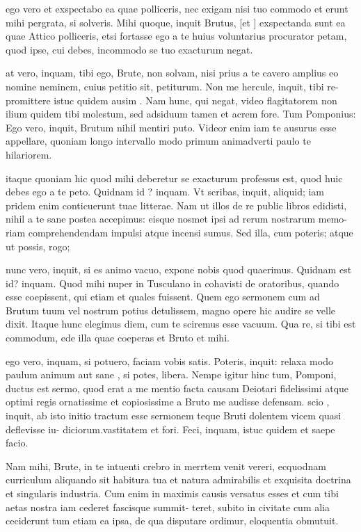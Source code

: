  ego vero et exspectabo ea quae polliceris, nec exigam nisi tuo commodo et erunt mihi pergrata, si solveris. Mihi quoque, inquit Brutus, [et ] exspectanda sunt ea quae Attico polliceris, etsi fortasse ego a te huius voluntarius procurator petam, quod ipse, cui debes, incommodo se tuo exacturum negat.

 at vero, inquam, tibi ego, Brute, non solvam, nisi prius a te cavero amplius eo nomine neminem, cuius petitio sit, petiturum. Non me hercule, inquit, tibi re- promittere istuc quidem ausim . Nam hunc, qui negat, video flagitatorem non ilium quidem tibi molestum, sed adsiduum tamen et acrem fore. Tum Pomponius: Ego vero, inquit, Brutum nihil mentiri puto. Videor enim iam te ausurus esse appellare, quoniam longo intervallo modo primum animadverti paulo te hilariorem.

 itaque quoniam hic quod mihi deberetur se exacturum professus est, quod huic debes ego a te peto. Quidnam id ? inquam. Vt scribas, inquit, aliquid; iam pridem enim conticuerunt tuae litterae. Nam ut illos de re public libros edidisti, nihil a te sane postea accepimus: eisque nosmet ipsi ad rerum nostrarum memo- riam comprehendendam impulsi atque incensi sumus. Sed illa, cum poteris; atque ut possis, rogo;

 nunc vero, inquit, si es animo vacuo, expone nobis quod quaerimus. Quidnam est id? inquam. Quod mihi nuper in Tusculano in cohavisti de oratoribus, quando esse coepissent, qui etiam et quales fuissent. Quem ego sermonem cum ad Brutum tuum vel nostrum potius detulissem, magno opere hic audire se velle dixit. Itaque hunc elegimus diem, cum te sciremus esse vacuum. Qua re, si tibi est commodum, ede illa quae coeperas et Bruto et mihi.

 ego vero, inquam, si potuero, faciam vobis satis. Poteris, inquit: relaxa modo paulum animum aut sane , si potes, libera. Nempe igitur hinc tum, Pomponi, ductus est sermo, quod erat a me mentio facta causam Deiotari fidelissimi atque optimi regis ornatissime et copiosissime a Bruto me audisse defensam. scio , inquit, ab isto initio tractum esse sermonem teque Bruti dolentem vicem quasi deflevisse iu- diciorum.vastitatem et fori. Feci, inquam, istuc quidem et saepe facio.

 Nam mihi, Brute, in te intuenti crebro in merrtem venit vereri, ecquodnam curriculum aliquando sit habitura tua et natura admirabilis et exquisita doctrina et singularis industria. Cum enim in maximis causis versatus esses et cum tibi aetas nostra iam cederet fascisque summit- teret, subito in civitate cum alia ceciderunt tum etiam ea ipsa, de qua disputare ordimur, eloquentia obmutuit.

